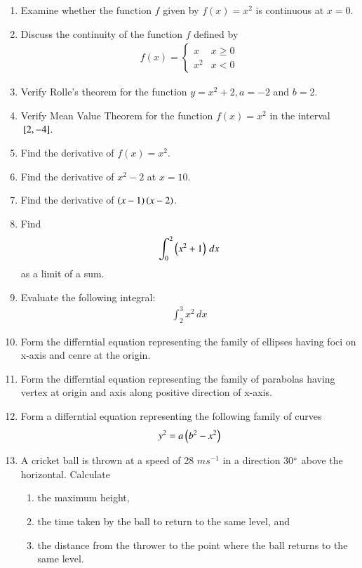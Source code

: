 \begin{enumerate}[label=\arabic*.,ref=\thesubsection.\theenumi]
%
\item Examine whether the function $f$ given by $f(x) = x^2$ is continuous at $x = 0$.
%
\item Discuss the continuity of the function $f$ defined by 
%
\begin{align}
f(x)  = 
\begin{cases}
x & x \ge 0
\\
x^2 & x < 0
\end{cases}
\end{align}
%
\item Verify Rolle's theorem for the function $y = x^2+2, a = -2$ and $b = 2$.
\item Verify Mean Value Theorem for the function $f(x) = x^2$ in the interval ${}\left[2,-4\right]$.
\item Find the derivative of $f(x) = x^2$.
\item Find the derivative of $ x^2 - 2$ at $x = 10$.
\item Find the derivative of $ \left(x-1\right) \left(x-2\right)$.
%
%
\item Find 
\begin{align}
\int_{0}^{2} \left(x^2+1\right)\,dx
\end{align}
%
as a limit of a sum.
\item Evaluate the following integral:
%
\begin{align}
\int_{2}^{3}x^2 \,dx
\end{align}
%
\item Form the differntial equation representing the family of ellipses having foci on x-axis and cenre at the origin.
%
\item Form the differntial equation representing the family of parabolas having vertex at origin and axis along positive direction of x-axis.
\item Form a differntial equation representing the following family of curves
%
\begin{align}
y^2 = a\left(b^2-x^2\right)
\end{align}
%
\item  A cricket ball is thrown at a speed of 28 $m s^{-1}$
in a direction 30$\degree$ above
the horizontal. Calculate 
\begin{enumerate}
\item  the maximum height, 
\item  the time taken by the ball to return to the same level, and 
\item  the distance from the thrower to the point where the ball returns to the same level.
\end{enumerate}

\end{enumerate}
